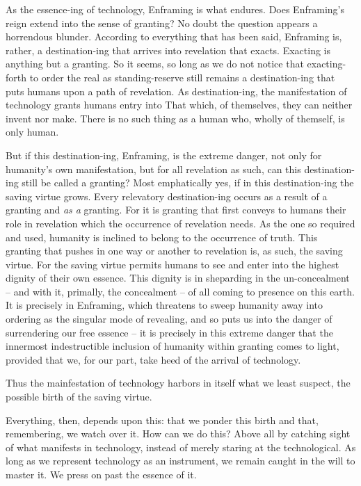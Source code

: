 \documentclass[paper=a4, fontsize=11pt,twoside]{scrartcl}
\begin{document}
As the essence-ing of technology, Enframing is what endures. Does Enframing's reign extend into the sense of granting? No doubt the question appears a horrendous blunder. According to everything that has been said, Enframing is, rather, a destination-ing that arrives into revelation that exacts. Exacting is anything but a granting. So it seems, so long as we do not notice that exacting-forth to order the real as standing-reserve still remains a destination-ing that puts humans upon a path of revelation. As destination-ing, the manifestation of technology grants humans entry into That which, of themselves, they can neither invent nor make. There is no such thing as a human who, wholly of themself, is only human.

But if this destination-ing, Enframing, is the extreme danger, not only for humanity's own manifestation, but for all revelation as such, can this destination-ing still be called a granting? Most emphatically yes, if in this destination-ing the saving virtue grows. Every relevatory destination-ing occurs as a result of a granting and \textit{as a} granting. For it is granting that first conveys to humans their role in revelation which the occurrence of revelation needs. As the one so required and used, humanity is inclined to belong to the occurrence of truth. This granting that pushes in one way or another to revelation is, as such, the saving virtue. For the saving virtue permits humans to see and enter into the highest dignity of their own essence. This dignity is in sheparding in the un-concealment -- and with it, primally, the concealment -- of all coming to presence on this earth. It is precisely in Enframing, which threatens to sweep humanity away into ordering as the singular mode of revealing, and so puts us into the danger of surrendering our free essence -- it is precisely in this extreme danger that the innermost indestructible inclusion of humanity within granting comes to light, provided that we, for our part, take heed of the arrival of technology.

Thus the mainfestation of technology harbors in itself what we least suspect, the possible birth of the saving virtue. 

Everything, then, depends upon this: that we ponder this birth and that, remembering, we watch over it. How can we do this? Above all by catching sight of what manifests in technology, instead of merely staring at the technological. As long as we represent technology as an instrument, we remain caught in the will to master it. We press on past the essence of it.
\end{document}
